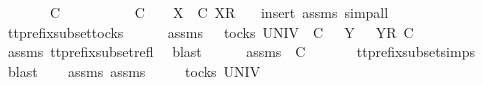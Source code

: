 \begin{isabellebody}
\ \ \ \ {\isasymrho}{\isacharprime}\ {\isacharat}\ {\isasymsigma}{\isacharprime}\ {\isasymlesssim}\isactrlsub C\ {\isasymrho}\ {\isacharat}\ {\isasymsigma}\ {\isasymand}\ \isanewline
\ \ \ \ {\isacharparenleft}{\isasymsigma}{\isacharprime}\ {\isasymlesssim}\isactrlsub C\ {\isasymsigma}\ {\isasymor}\ {\isacharparenleft}{\isasymexists}\ X{\isachardot}\ {\isasymsigma}{\isacharprime}\ {\isasymlesssim}\isactrlsub C\ {\isacharbrackleft}X{\isacharbrackright}\isactrlsub R\ {\isacharhash}\ {\isasymsigma}{\isacharparenright}{\isacharparenright}{\isachardoublequoteclose}\isanewline
%
\isadelimproof
%
\endisadelimproof
%
\isatagproof
{}\isamarkupfalse%
\ {\isacharparenleft}insert\ assms{\isacharcomma}\ simp{\isacharunderscore}all{\isacharparenright}\isanewline
\ \ \isamarkupfalse%
\ tt{\isacharunderscore}prefix{\isacharunderscore}subset{\isacharunderscore}tocks\isanewline
\ \ \isamarkupfalse%
\ {\isasymrho}{\isacharprime}\ \ {\isasymrho}{\isacharprime}{\isacharunderscore}assms{\isacharcolon}\ {\isachardoublequoteopen}{\isasymrho}{\isacharprime}\ {\isasymin}\ tocks\ UNIV{\isachardoublequoteclose}\ {\isachardoublequoteopen}{\isacharparenleft}{\isasymrho}{\isacharprime}\ {\isasymlesssim}\isactrlsub C\ {\isasymrho}{\isacharparenright}\ {\isasymor}\ {\isacharparenleft}{\isasymexists}Y{\isachardot}\ {\isasymrho}{\isacharprime}\ {\isacharat}\ {\isacharbrackleft}{\isacharbrackleft}Y{\isacharbrackright}\isactrlsub R{\isacharbrackright}\ {\isasymlesssim}\isactrlsub C\ {\isasymrho}{\isacharparenright}{\isachardoublequoteclose}\isanewline
\ \ \ \ \isamarkupfalse%
\ assms{\isacharparenleft}{}{\isacharparenright}\ tt{\isacharunderscore}prefix{\isacharunderscore}subset{\isacharunderscore}refl\ \isamarkupfalse%
\ blast\isanewline
\ \ \isamarkupfalse%
\ {\isasymsigma}{\isacharprime}\ \ {\isasymsigma}{\isacharprime}{\isacharunderscore}assms{\isacharcolon}\ {\isachardoublequoteopen}{\isasymsigma}{\isacharprime}\ {\isasymlesssim}\isactrlsub C\ {\isasymsigma}{\isachardoublequoteclose}\isanewline
\ \ \ \ \isamarkupfalse%
\ tt{\isacharunderscore}prefix{\isacharunderscore}subset{\isachardot}simps{\isacharparenleft}{}{\isacharparenright}\ \isamarkupfalse%
\ blast\isanewline
\ \ \isamarkupfalse%
\ {\isasymrho}{\isacharprime}{\isacharunderscore}assms\ {\isasymsigma}{\isacharprime}{\isacharunderscore}assms\ \isamarkupfalse%
\ {\isachardoublequoteopen}{\isasymexists}{\isasymrho}{\isacharprime}{\isachardot}\ {\isasymrho}{\isacharprime}\ {\isasymin}\ tocks\ UNIV\ {\isasymand}\isanewline

\end{isabellebody}

